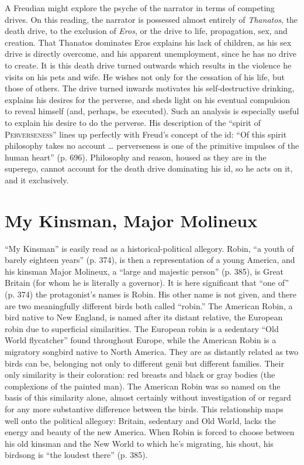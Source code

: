 \documentclass[man,12pt,natbib]{apa6}
\begin{document}
A Freudian might explore the psyche of the narrator in terms of competing
drives.  On this reading, the narrator is possessed almost entirely of
\emph{Thanatos}, the death drive, to the exclusion of \emph{Eros}, or the drive
to life, propagation, sex, and creation. That Thanatos dominates Eros explains
his lack of children, as his sex drive is directly overcome, and his apparent
unemployment, since he has no drive to create. It is this death drive turned
outwards which results in the violence he visits on his pets and wife. He
wishes not only for the cessation of his life, but those of others. The drive
turned inwards motivates his self-destructive drinking, explains his desires
for the perverse, and sheds light on his eventual compulsion to reveal himself
(and, perhaps, be executed). Such an analysis is especially useful to explain
his desire to do the perverse. His description of the ``spirit of
P\textsc{erverseness}'' lines up perfectly with Freud's concept of the id: ``Of
this spirit philosophy takes no account \dots{}  perverseness is one of the
primitive impulses of the human heart'' (p. 696).  Philosophy and reason,
housed as they are in the superego, cannot account for the death drive
dominating his id, so he acts on it, and it exclusively.

\section{My Kinsman, Major Molineux}
\nocite{Hawthorne12a,Lesser55}

``My Kinsman'' is easily read as a historical-political allegory. Robin, ``a
youth of barely eighteen years'' (p. 374), is then a representation of a young
America, and his kinsman Major Molineux, a ``large and majestic person'' (p.
385), is Great Britain (for whom he is literally a governor). It is here
significant that ``one of'' (p. 374) the protagonist's names is Robin. His
other name is not given, and there are two meaningfully different birds both
called ``robin.'' The American Robin, a bird native to New England, is named
after its distant relative, the European robin due to superficial similarities.
The European robin is a sedentary ``Old World flycatcher'' found throughout
Europe, while the American Robin is a migratory songbird native to North
America.  They are as distantly related as two birds can be, belonging not only
to different genii but different families. Their only similarity is their
coloration: red breasts and black or gray bodies (the complexions of the
painted man). The American Robin was so named on the basis of this similarity
alone, almost certainly without investigation of or regard for any more
substantive difference between the birds.  This relationship maps well onto the
political allegory: Britain, sedentary and Old World, lacks the energy and
beauty of the new America. When Robin is forced to choose between his old
kinsman and the New World to which he's migrating, his shout, his birdsong is
``the loudest there'' (p. 385).
\end{document}
